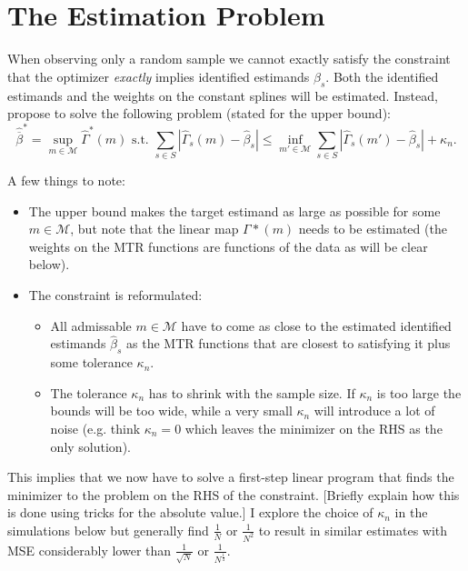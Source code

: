 \documentclass{article}
\begin{document}
\section{The Estimation Problem}
When observing only a random sample we cannot exactly satisfy the constraint that the optimizer \textit{exactly} implies identified estimands $\beta_s$.
Both the identified estimands and the weights on the constant splines will be estimated. Instead, \citet{mogstad2018using} propose to solve the following problem (stated for the upper bound):
\begin{equation*}
    \label{eq:est_lp}
    \hat{\overline{\beta}}^* = \sup_{m\in\mathcal{M}} \hat{\Gamma}^*(m) \text{ s.t. } \sum_{s\in S}|\hat{\Gamma}_s(m) - \hat{\beta}_s| \leq \inf_{m'\in\mathcal{M}} \sum_{s\in S}|\hat{\Gamma}_s(m') - \hat{\beta}_s| + \kappa_n.
\end{equation*}

A few things to note:
\begin{itemize}
    \item The upper bound makes the target estimand as large as possible for some $m\in\mathcal{M}$, but note that the linear map $\Gamma*(m)$ needs to be estimated (the weights on the MTR functions are functions of the data as will be clear below).
    \item The constraint is reformulated:
    \begin{itemize}
        \item All admissable $m\in\mathcal{M}$ have to come as close to the estimated identified estimands $\hat{\beta}_s$ as the MTR functions that are closest to satisfying it plus some tolerance $\kappa_n$.
        \item The tolerance $\kappa_n$ has to shrink with the sample size. If $\kappa_n$ is too large the bounds will be too wide, while a very small $\kappa_n$ will introduce a lot of noise (e.g. think $\kappa_n = 0$ which leaves the minimizer on the RHS as the only solution). 
    \end{itemize}
\end{itemize}

This implies that we now have to solve a first-step linear program that finds the minimizer to the problem on the RHS of the constraint. [Briefly explain how this is done using tricks for the absolute value.] 
I explore the choice of $\kappa_n$ in the simulations below but generally find $\frac{1}{N}$ or $\frac{1}{N^2}$ to result in similar estimates with MSE considerably lower than $\frac{1}{\sqrt{N}}$ or $\frac{1}{N^\frac{1}{4}}$.
\end{document}

